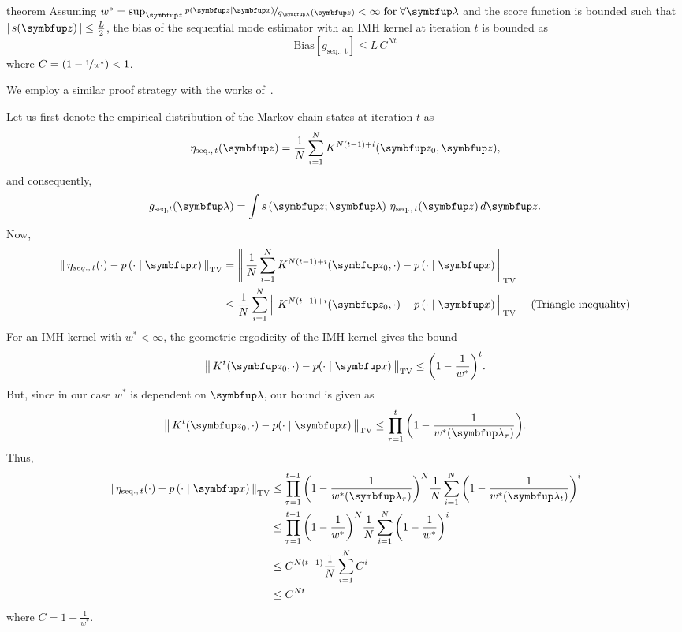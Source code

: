 
\begin{theoremEnd}{theorem}\label{thm:bias_seq}
  Assuming \(w^* = \sup_{\vz} \nicefrac{p\left(\vz\mid\vx\right)}{q_{\vlambda}\left(\vz\right)} < \infty\; \text{for} \; \forall \vlambda \) and the score function is bounded such that \(\left|\,s(\vz)\,\right| \leq \frac{L}{2}\), the bias of the sequential mode estimator with an IMH kernel at iteration \(t\) is bounded as
  {\small
  \[
    \mathrm{Bias}\left[ g_{\mathrm{seq.,\, t}} \right] \leq L \, C^{N t} 
  \]
  }
  where \(C = \left(1 - \nicefrac{1}{w^*}\right) < 1\).
\end{theoremEnd}
%
\begin{proofEnd}
  We employ a similar proof strategy with the works of~\citet[Theorem 4]{jiang_mcmc_2021}.

  Let us first denote the empirical distribution of the Markov-chain states at iteration \(t\) as
  \begin{align}
    \eta_{\mathrm{seq.},\, t}(\vz) = \frac{1}{N} \sum_{i=1}^N K^{N (t-1) + i}(\vz_0, \vz),
  \end{align}
  and consequently,
  \begin{align}
      g_{\mathrm{seq}, t}(\vlambda) = \int s\left(\vz; \vlambda\right) \, \eta_{\mathrm{seq.},\, t}(\vz) \, d\vz.
  \end{align}
  Now,
  \begin{align}
    \DTV{ \eta_{seq.,\, t}(\cdot) }{p\left(\cdot\mid\vx\right)}
    &= \DTV{\frac{1}{N} \sum_{i=1}^N K^{N (t-1) + i}(\vz_0, \cdot)}{p\left(\cdot\mid\vx\right)} \\
    &\leq \frac{1}{N} \sum_{i=1}^N  \DTV{K^{N (t-1) + i}(\vz_0, \cdot)}{p\left(\cdot\mid\vx\right)} &\text{ (Triangle inequality)}
  \end{align}
 For an IMH kernel with \(w^* < \infty\), the geometric ergodicity of the IMH kernel \citep[Theorem 2.1]{10.2307/2242610} gives the bound
 \begin{align}
   \DTV{K^t(\vz_{0}, \cdot)}{p(\cdot\mid\vx)} \leq {\left(1 - \frac{1}{w^*}\right)}^t.
 \end{align}
 But, since in our case \(w^*\) is dependent on \(\vlambda\), our bound is given as
 \begin{align}
   \DTV{K^t(\vz_{0}, \cdot)}{p(\cdot\mid\vx)} \leq \prod_{\tau=1}^t {\left(1 - \frac{1}{w^*(\vlambda_{\tau})}\right)}.
 \end{align}
 Thus, 
  \begin{align}
    \DTV{ \eta_{\mathrm{seq.},\, t}(\cdot) }{p\left(\cdot\mid\vx\right)}
    &\leq  \prod_{\tau=1}^{t-1} {\left( 1 - \frac{1}{w^*(\vlambda_{\tau})} \right)}^N \frac{1}{N} \sum_{i=1}^N {\left( 1 - \frac{1}{w^*(\vlambda_{t})} \right)}^i \\
    &\leq  \prod_{\tau=1}^{t-1} {\left( 1 - \frac{1}{w^*} \right)}^N \frac{1}{N} \sum_{i=1}^N {\left( 1 - \frac{1}{w^*} \right)}^i \\
    &\leq C^{N (t-1)} \frac{1}{N} \sum_{i=1}^N C^i \\
    &\leq C^{N t}
  \end{align}
  where \(C = 1 - \frac{1}{w^*} \).


\end{proofEnd}
